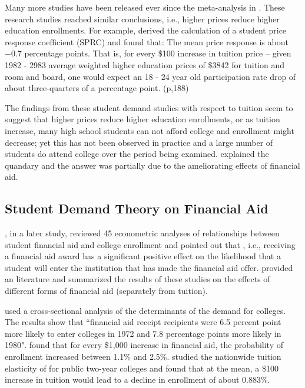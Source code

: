 \documentclass[12pt,english]{report}
\begin{document}
Many more studies have been released ever since the meta-analysis in \citep{Leslie1987}. These research studies reached similar conclusions, i.e., higher prices reduce higher education enrollments.  For example,\citet{Leslie1987} derived the calculation of a student price response coefficient (SPRC) and found that: The mean price response is about $-0.7$ percentage points. That is, for every \$100 increase in tuition price -- given 1982 - 2983 average weighted higher education prices of \$3842 for tuition and room and board, one would expect an 18 - 24 year old participation rate drop of about three-quarters of a percentage point. (p,188)

The findings from these student demand studies with respect to tuition seem to suggest that higher prices reduce higher education enrollments, or as tuition increase, many high school students can not afford college and enrollment might decrease; yet this has not been observed in practice and a large number of students do attend college over the period being examined. \citet{Leslie1987} explained the quandary and the answer was partially due to the ameliorating effects of financial aid. 

\subsection{Student Demand Theory on Financial Aid}
\citet{Leslie1988}, in a later study, reviewed 45 econometric analyses of relationships between student financial aid and college enrollment and pointed out that , i.e., receiving a financial aid award has a significant positive effect on the likelihood that a student will enter the institution that has made the financial aid offer. \citet{Heller1997} provided an literature and summarized the results of these studies on the effects of different forms of financial aid (separately from tuition). 

\citet{JACKSON198815} used a cross-sectional analysis of the determinants of the demand for colleges.  The results show that ``financial aid receipt recipients were 6.5 percent point more likely to enter colleges in 1972 and 7.8 percentage points more likely in 1980". \citet{Braunstein1999} found that for every \$1,000 increase in financial aid, the probability of enrollment increased between 1.1\% and 2.5\%. \citet{Crouse2015} studied the nationwide tuition elasticity of for public two-year colleges and found that at the mean, a \$100 increase in tuition would lead to a decline in enrollment of about 0.883\%.
\end{document}
